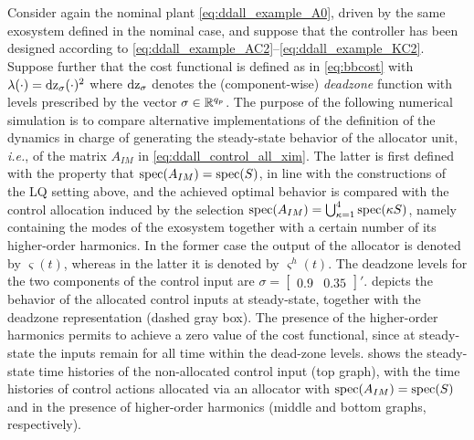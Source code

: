 \begin{example}
  Consider again the nominal plant \eqref{eq:ddall_example_A0}, driven by the same exosystem defined in the nominal case, and suppose that the controller has been designed according to \eqref{eq:ddall_example_AC2}--\eqref{eq:ddall_example_KC2}. Suppose further that the cost functional is defined as in \eqref{eq:bbcost} with $\lambda(\cdot) = {\rm dz}_{\sigma}(\cdot)^2$ where ${\rm dz}_{\sigma}$ denotes the (component-wise) \emph{deadzone} function with levels prescribed by the vector $\sigma\in\mathbb{R}^{{q_p}}$. The purpose of the following numerical simulation is to compare alternative implementations of the definition of the dynamics in charge of generating the steady-state behavior of the allocator unit, \emph{i.e.}, of the matrix $A_{IM}$ in \eqref{eq:ddall_control_all_xim}. The latter is first defined with the property that $\operatorname{spec}(A_{IM}) = \operatorname{spec}(S)$, in line with the constructions of the LQ
  setting above, and the achieved optimal behavior is compared with the control allocation induced by the selection $\operatorname{spec}(A_{IM}) = \bigcup_{\kappa = 1}^4\operatorname{spec}(\kappa S)$, namely containing the modes of the exosystem together with a certain number of its higher-order harmonics. In the former case the output of the allocator is denoted by $\varsigma(t)$, whereas in the latter it is denoted by $\varsigma^{h}(t)$. The deadzone levels for the two components of the control input are $\sigma = \begin{bmatrix}0.9 & 0.35\end{bmatrix}'$.  depicts the behavior of the allocated control inputs at steady-state, together with the deadzone representation (dashed gray box). The presence of the higher-order harmonics permits to achieve a zero value of the cost functional, since at steady-state the inputs remain for all time within the dead-zone levels.  shows the steady-state time histories of the non-allocated control input (top graph), with the time histories of control actions allocated via an allocator with $\operatorname{spec}(A_{IM}) = \operatorname{spec}(S)$ and in the presence of higher-order harmonics (middle and bottom graphs, respectively).\closeexample
\end{example}

